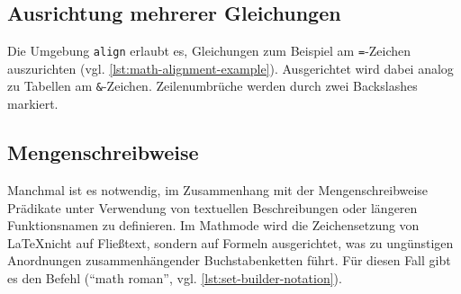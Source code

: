 
\subsection{Ausrichtung mehrerer Gleichungen}

Die Umgebung \texttt{align} erlaubt es, Gleichungen zum Beispiel am \texttt{=}-Zeichen auszurichten (vgl. \cref{lst:math-alignment-example}).
Ausgerichtet wird dabei analog zu Tabellen am \texttt{\&}-Zeichen.
Zeilenumbrüche werden durch zwei Backslashes markiert.


\subsection{Mengenschreibweise}

Manchmal ist es notwendig, im Zusammenhang mit der Mengenschreibweise Prädikate unter Verwendung von textuellen Beschreibungen oder längeren Funktionsnamen zu definieren.
Im Mathmode wird die Zeichensetzung von \LaTeX nicht auf Fließtext, sondern auf Formeln ausgerichtet, was zu ungünstigen Anordnungen zusammenhängender Buchstabenketten führt.
Für diesen Fall gibt es den Befehl \texttt{\mathrm{}} (\enquote{math roman}, vgl. \cref{lst:set-builder-notation}).

